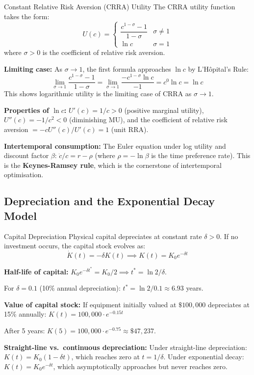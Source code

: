 \documentclass[12pt, a4paper]{article}
\theoremstyle{definition}
\begin{document}
\begin{exbox}{Constant Relative Risk Aversion (CRRA) Utility}
The CRRA utility function takes the form:
\[
  U(c) = \begin{cases}
    \dfrac{c^{1-\sigma}-1}{1-\sigma} & \sigma \neq 1 \\[6pt]
    \ln c & \sigma = 1
  \end{cases}
\]
where $\sigma > 0$ is the coefficient of relative risk aversion.

\textbf{Limiting case:} As $\sigma \to 1$, the first formula approaches $\ln c$ by L'H\^opital's Rule:
\[
  \lim_{\sigma\to 1}\frac{c^{1-\sigma}-1}{1-\sigma}
  = \lim_{\sigma\to 1}\frac{-c^{1-\sigma}\ln c}{-1}
  = c^0 \ln c = \ln c
\]
This shows logarithmic utility is the limiting case of CRRA as $\sigma\to 1$.

\textbf{Properties of $\ln c$:}
$U'(c) = 1/c > 0$ (positive marginal utility), $U''(c) = -1/c^2 < 0$ (diminishing MU), and the coefficient of relative risk aversion $= -cU''(c)/U'(c) = 1$ (unit RRA).

\textbf{Intertemporal consumption:} The Euler equation under log utility and discount factor $\beta$:
$\dot c/c = r - \rho$ (where $\rho=-\ln\beta$ is the time preference rate). This is the \textbf{Keynes-Ramsey rule}, which is the cornerstone of intertemporal optimisation.
\end{exbox}

\subsection{Depreciation and the Exponential Decay Model}

\begin{exbox}{Capital Depreciation}
Physical capital depreciates at constant rate $\delta>0$. If no investment occurs, the capital stock evolves as:
\[
  \dot K(t) = -\delta K(t)
  \implies K(t) = K_0 e^{-\delta t}
\]

\textbf{Half-life of capital:}
$K_0 e^{-\delta t^*} = K_0/2 \implies t^* = \ln 2/\delta$.

For $\delta = 0.1$ (10\% annual depreciation): $t^* = \ln2/0.1 \approx 6.93$ years.

\textbf{Value of capital stock:}
If equipment initially valued at $\$100{,}000$ depreciates at 15\% annually:
$K(t) = 100{,}000 \cdot e^{-0.15t}$

After 5 years: $K(5) = 100{,}000 \cdot e^{-0.75} \approx \$47{,}237$.

\textbf{Straight-line vs.\ continuous depreciation:}
Under straight-line depreciation: $K(t) = K_0(1-\delta t)$, which reaches zero at $t=1/\delta$.
Under exponential decay: $K(t) = K_0 e^{-\delta t}$, which asymptotically approaches but never reaches zero.
\end{exbox}
\end{document}
